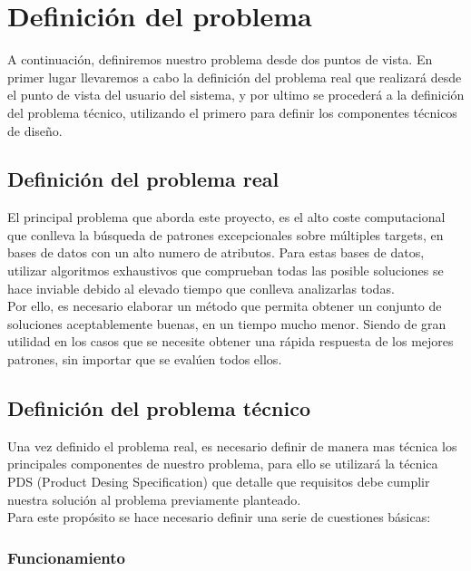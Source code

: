 \documentclass[a4paper,12pt,twoside,final]{book}
\begin{document}
\newpage
\section{Definición del problema}

A continuación, definiremos nuestro problema desde dos puntos de vista. En primer lugar llevaremos a cabo la definición del problema real que realizará desde el punto de vista del usuario del sistema, y por ultimo se procederá a la definición del problema técnico, utilizando el primero para definir los componentes técnicos de diseño.

\subsection{Definición del problema real}

El principal problema que aborda este proyecto, es el alto coste computacional que conlleva la búsqueda de patrones excepcionales sobre múltiples targets, en bases de datos con un alto numero de atributos. Para estas bases de datos, utilizar algoritmos exhaustivos que comprueban todas las posible soluciones se hace inviable debido al elevado tiempo que conlleva analizarlas todas.\\

Por ello, es necesario elaborar un método que permita obtener un conjunto de soluciones aceptablemente buenas, en un tiempo mucho menor. Siendo de gran utilidad en los casos que se necesite obtener una rápida respuesta de los mejores patrones, sin importar que se evalúen todos ellos. 

\subsection{Definición del problema técnico}

Una vez definido el problema real, es necesario definir de manera mas técnica los principales componentes de nuestro problema, para ello se utilizará la técnica PDS (Product Desing Specification) que detalle que requisitos debe cumplir nuestra solución al problema previamente planteado.\\

Para este propósito se hace necesario definir una serie de cuestiones básicas:

\subsubsection{Funcionamiento}
\end{document}
